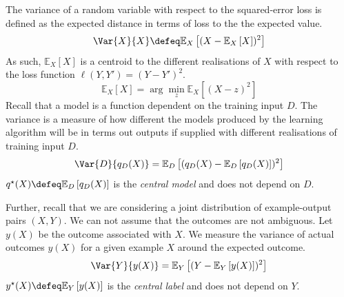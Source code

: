\documentclass[
    a4paper, %
	fontsize=10pt, %
	twoside=false, %
]{kaobook}
\begin{document}
\begin{titlepage}

The variance of a random variable with respect to the squared-error loss is defined as the expected distance in terms of loss to the the expected value.
$$
\Var{X}{X} \defeq \mathbb{E}_{X}\left[ (X - \mathbb{E}_{X}\left[ X \right] )^2 \right]
$$
As such, $\mathbb{E}_{X}\left[ X \right]$ is a centroid to the different realisations of $X$ with respect to the loss function $\ell(Y, Y') = (Y-Y')^2$.
$$
\mathbb{E}_{X}\left[ X \right] = \arg\min _{z} \mathbb{E}_{X}\left[ (X-z)^2 \right] 
$$
Recall that a model is a function dependent on the training input $D$. The variance is a measure of how different the models produced by the learning algorithm will be in terms out outputs if supplied with different realisations of training input $D$.
$$
\Var{D}{q_{D}(X)} = \mathbb{E}_{D}\left[ (q_{D}(X) - \mathbb{E}_{D}\left[ q_{D}(X) \right] )^2 \right] 
$$
$q^\star(X) \defeq \mathbb{E}_{D}\left[ q_{D}(X) \right]$ is the \textit{central model} and does not depend on $D$.

Further, recall that we are considering a joint distribution of example-output pairs $(X,Y)$. We can not assume that the outcomes are not ambiguous. Let $y(X)$ be the outcome associated with $X$.
We measure the variance of actual outcomes $y(X)$ for a given example $X$ around the expected outcome.
$$
\Var{Y}{y(X)} = \mathbb{E}_{Y}\left[ (Y-\mathbb{E}_{Y}\left[ y(X) \right] )^2 \right] 
$$
$y^\star(X) \defeq \mathbb{E}_{Y}\left[ y(X) \right]$ is the \textit{central label} and does not depend on $Y$.




\end{titlepage}
\end{document}
